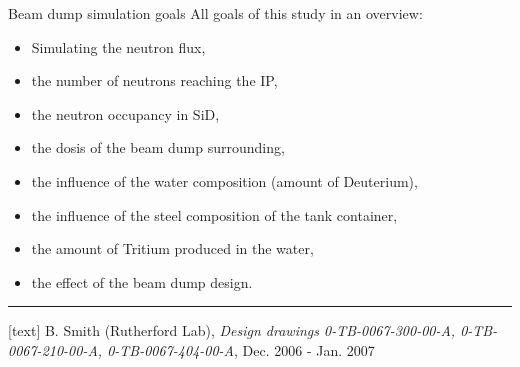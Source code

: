 {\begin{frame}{Beam dump simulation goals}
 \flukalogo
 All goals of this study in an overview:
\begin{itemize}
 \item Simulating the neutron flux,
 \item the number of neutrons reaching the IP,
 \item the neutron occupancy in SiD,
 \item the dosis of the beam dump surrounding,
 \item the influence of the water composition (amount of Deuterium),
 \item the influence of the steel composition of the tank container,
 \item the amount of Tritium produced in the water,
 \item the effect of the beam dump design.
\end{itemize}
\vspace*{0.5cm}
\rule{12cm}{.1pt}
\begin{thebibliography}{9}
[text]
 B. Smith (Rutherford Lab), \emph{Design drawings 0-TB-0067-300-00-A, 0-TB-0067-210-00-A, 0-TB-0067-404-00-A}, Dec. 2006 - Jan. 2007
\end{thebibliography}
\end{frame}
}


